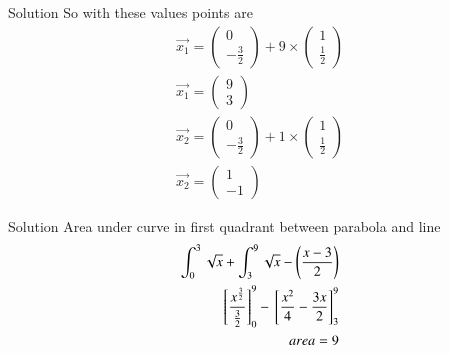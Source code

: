 \documentclass{beamer}
\begin{document}
\begin{frame}{Solution}
So with these values points are
\begin{align}
    \vec{x_1}=\begin{pmatrix}0\\-\frac{3}{2}\end{pmatrix}+9\times \begin{pmatrix}1\\\frac{1}{2}\end{pmatrix}\\
    \vec{x_1}= \begin{pmatrix}9\\ 3\end{pmatrix} \\
    \vec{x_2}=\begin{pmatrix}0\\-\frac{3}{2}\end{pmatrix}+1\times \begin{pmatrix}1\\\frac{1}{2}\end{pmatrix}\\
    \vec{x_2}= \begin{pmatrix}1\\ -1\end{pmatrix}
\end{align}
\end{frame}
\begin{frame}{Solution}
Area under curve in first quadrant between parabola and line
\begin{align}
    \int_0^{3}\sqrt{x}+\int_3^{9}\sqrt{x}-\left(\frac{x-3}{2}\right)\\
    {}\left[\frac{x^{\frac{3}{2}}}{\frac{3}{2}}\right]^9_0-{}\left[\frac{x^2}{4}-\frac{3x}{2}\right]^9_3\\
    area=9
\end{align}
\end{frame}
\end{document}
